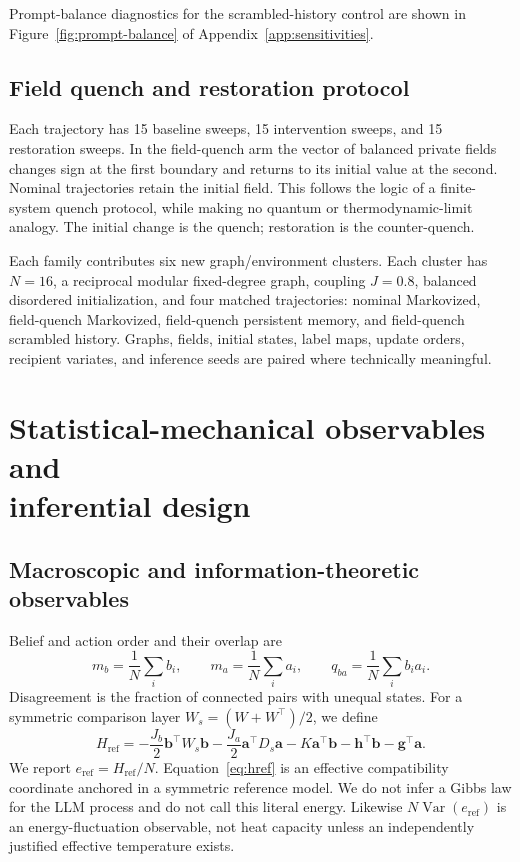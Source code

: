 \documentclass[12pt]{article}
\begin{document}
Prompt-balance diagnostics for the scrambled-history control are shown in Figure~\ref{fig:prompt-balance} of Appendix~\ref{app:sensitivities}.

\subsection{Field quench and restoration protocol}
\label{sec:quench-protocol}

Each trajectory has 15 baseline sweeps, 15 intervention sweeps, and 15
restoration sweeps.  In the field-quench arm the vector of balanced private
fields changes sign at the first boundary and returns to its initial value at
the second.  Nominal trajectories retain the initial field.  This follows the
logic of a finite-system quench protocol, while making no quantum or
thermodynamic-limit analogy.  The initial
change is the quench; restoration is the counter-quench.

Each family contributes six new graph/environment clusters.  Each cluster has
$N=16$, a reciprocal modular fixed-degree graph, coupling $J=0.8$, balanced
disordered initialization, and four matched trajectories: nominal Markovized,
field-quench Markovized, field-quench persistent memory, and field-quench
scrambled history.  Graphs, fields, initial states, label maps, update orders,
recipient variates, and inference seeds are paired where technically
meaningful.

\section{Statistical-mechanical observables and\texorpdfstring{\\}{ }inferential design}
\label{sec:observables-inference}

\subsection{Macroscopic and information-theoretic observables}
\label{sec:order-compatibility}

Belief and action order and their overlap are
\begin{equation}
m_b=\frac{1}{N}\sum_i b_i,\qquad
m_a=\frac{1}{N}\sum_i a_i,\qquad
q_{ba}=\frac{1}{N}\sum_i b_i a_i.
\end{equation}
Disagreement is the fraction of connected pairs with unequal states.  For a
symmetric comparison layer $W_s=(W+W^\top)/2$, we define
\begin{equation}
H_{\mathrm{ref}}=-\frac{J_b}{2}\bm b^\top W_s\bm b
-\frac{J_a}{2}\bm a^\top D_s\bm a
-K\bm a^\top\bm b-\bm h^\top\bm b-\bm g^\top\bm a .
\label{eq:href}
\end{equation}
We report $e_{\mathrm{ref}}=H_{\mathrm{ref}}/N$.  Equation~\eqref{eq:href} is
an effective compatibility coordinate anchored in a
symmetric reference model.  We do not infer a Gibbs law for the LLM process
and do not call this literal energy.  Likewise
$N\operatorname{Var}(e_{\mathrm{ref}})$ is an energy-fluctuation observable,
not heat capacity unless an independently justified effective temperature
exists.
\end{document}
